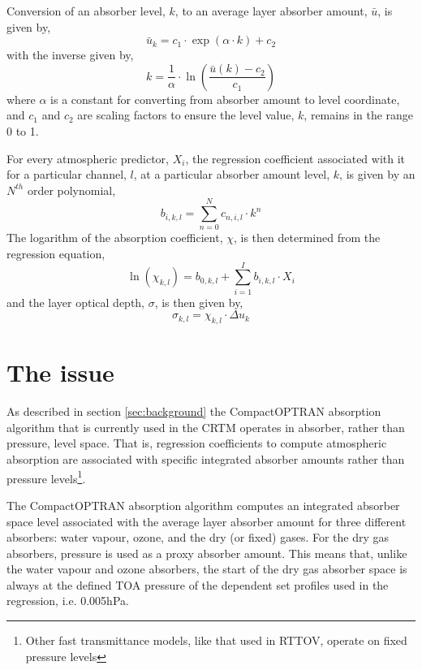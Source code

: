 Conversion of an absorber level, $k$, to an average layer absorber amount, $\bar{u}$, is given by,
\begin{equation}
  \bar{u}_{k} = c_{1}\cdot\exp(\alpha\cdot k) + c_{2}
\end{equation}
with the inverse given by,
\begin{equation}
  k = \frac{1}{\alpha}\cdot\ln\left(\frac{\bar{u}(k) - c_{2}}{c_{1}}\right)
\end{equation}
where $\alpha$ is a constant for converting from absorber amount to level coordinate, and $c_{1}$ and $c_{2}$ are scaling factors to ensure the level value, $k$, remains in the range 0 to 1.

For every atmospheric predictor, $X_{i}$, the regression coefficient associated with it for a particular channel, $l$, at a particular absorber amount level, $k$, is given by an $N^{th}$ order polynomial,
\begin{equation}
  b_{i,k,l} = \sum_{n=0}^{N} c_{n,i,l}\cdot k^{n}
\end{equation}
The logarithm of the absorption coefficient, $\chi$, is then determined from the regression equation,
\begin{equation}
  \ln(\chi_{k,l}) = b_{0,k,l} + \sum_{i=1}^{I} b_{i,k,l}\cdot X_{i}
\end{equation}
and the layer optical depth, $\sigma$, is then given by,
\begin{equation}
  \sigma_{k,l} = \chi_{k,l}\cdot\Delta{u_{k}}
\end{equation}


\section{The issue}
As described in section \ref{sec:background} the CompactOPTRAN absorption algorithm that is currently used in the CRTM operates in absorber, rather than pressure, level space. That is, regression coefficients to compute atmospheric absorption are associated with specific integrated absorber amounts rather than pressure levels\footnote{Other fast transmittance models, like that used in RTTOV, operate on fixed pressure levels}. 

The CompactOPTRAN absorption algorithm computes an integrated absorber space level associated with the average layer absorber amount for three different absorbers: water vapour, ozone, and the dry (or fixed) gases. For the dry gas absorbers, pressure is used as a proxy absorber amount. This means that, unlike the water vapour and ozone absorbers, the start of the dry gas absorber space is always at the defined TOA pressure of the dependent set profiles used in the regression, i.e. 0.005hPa.

